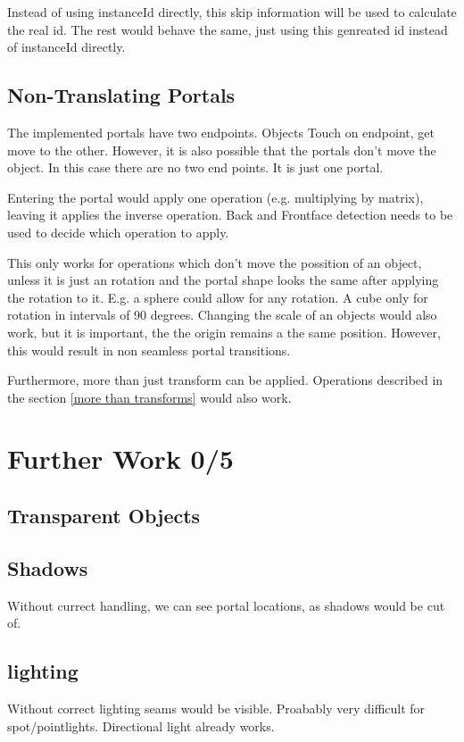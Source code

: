 Instead of using instanceId directly, this skip information will be used to calculate the real id. The rest would behave the same, just using this genreated id instead of instanceId directly.



\subsection{Non-Translating Portals}
The implemented portals have two endpoints. Objects Touch on endpoint, get move to the other. However, it is also possible that the portals don't move the object. In this case there are no two end points. It is just one portal.

Entering the portal would apply one operation (e.g. multiplying by matrix), leaving it applies the inverse operation. Back and Frontface detection needs to be used to decide which operation to apply.


This only works for operations which don't move the possition of an object, unless it is just an rotation and the portal shape looks the same after applying the rotation to it. E.g. a sphere could allow for any rotation. A cube only for rotation in intervals of 90 degrees.
Changing the scale of an objects would also work, but it is important, the the origin remains a the same position. However, this would result in non seamless portal transitions.

Furthermore, more than just transform can be applied. Operations described in the section \ref{more than transforms} would also work.



\section{Further Work 0/5}
\subsection{Transparent Objects}
\subsection{Shadows}
Without currect handling, we can see portal locations, as shadows would be cut of.
\subsection{lighting}
Without correct lighting seams would be visible. Proabably very difficult for spot/pointlights. Directional light already works.
